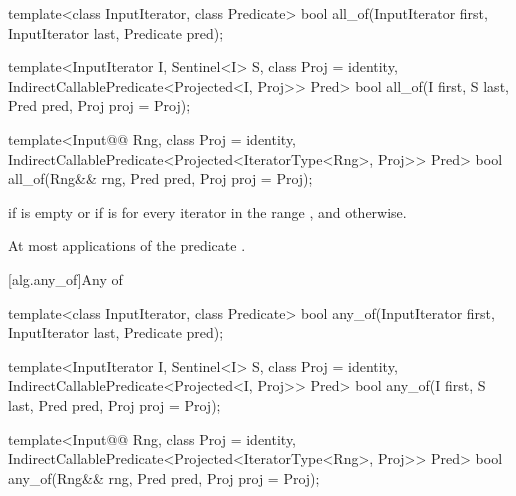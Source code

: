 %
\begin{removedblock}
\begin{itemdecl}
template<class InputIterator, class Predicate>
  bool all_of(InputIterator first, InputIterator last, Predicate pred);
\end{itemdecl}
\end{removedblock}
\begin{addedblock}
\begin{itemdecl}
template<InputIterator I, Sentinel<I> S, class Proj = identity,
    IndirectCallablePredicate<Projected<I, Proj>> Pred>
  bool all_of(I first, S last, Pred pred, Proj proj = Proj{});

template<Input@@ Rng, class Proj = identity,
    IndirectCallablePredicate<Projected<IteratorType<Rng>, Proj>> Pred>
  bool all_of(Rng&& rng, Pred pred, Proj proj = Proj{});
\end{itemdecl}
\end{addedblock}

\begin{itemdescr}
\pnum
\returns {} if
 is empty or if
is  for every iterator  in the range ,
and  otherwise.

\pnum
\complexity At most  applications of the predicate
.
\end{itemdescr}

[alg.any_of]{Any of}

%
\begin{removedblock}
\begin{itemdecl}
template<class InputIterator, class Predicate>
  bool any_of(InputIterator first, InputIterator last, Predicate pred);
\end{itemdecl}
\end{removedblock}
\begin{addedblock}
\begin{itemdecl}
template<InputIterator I, Sentinel<I> S, class Proj = identity,
    IndirectCallablePredicate<Projected<I, Proj>> Pred>
  bool any_of(I first, S last, Pred pred, Proj proj = Proj{});

template<Input@@ Rng, class Proj = identity,
    IndirectCallablePredicate<Projected<IteratorType<Rng>, Proj>> Pred>
  bool any_of(Rng&& rng, Pred pred, Proj proj = Proj{});
\end{itemdecl}
\end{addedblock}

